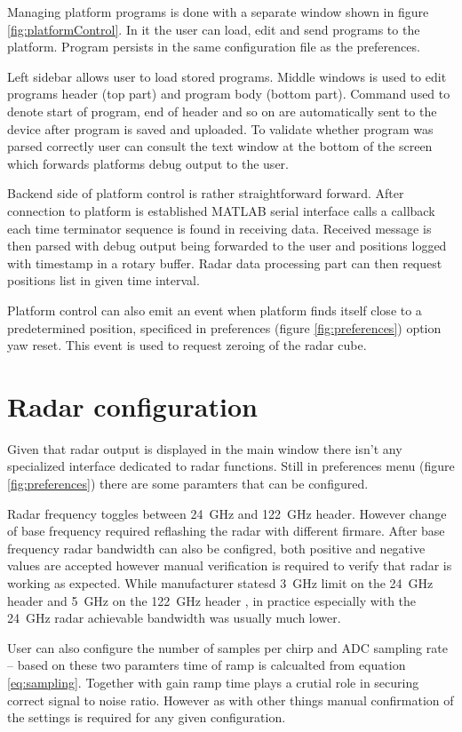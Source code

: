 Managing platform programs is done with a separate window shown in figure \ref{fig:platformControl}.
In it the user can load, edit and send programs to the platform.
Program persists in the same configuration file as the preferences.

Left sidebar allows user to load stored programs.
Middle windows is used to edit programs header (top part) and program body (bottom part).
Command used to denote start of program, end of header and so on are automatically sent to the device after program is saved and uploaded.
To validate whether program was parsed correctly user can consult the text window at the bottom of the screen which forwards platforms debug output to the user.

Backend side of platform control is rather straightforward forward.
After connection to platform is established MATLAB serial interface calls a callback each time terminator sequence is found in receiving data.
Received message is then parsed with debug output being forwarded to the user and positions logged with timestamp in a rotary buffer.
Radar data processing part can then request positions list in given time interval.

Platform control can also emit an event when platform finds itself close to a predetermined position, specificed in preferences (figure \ref{fig:preferences}) option yaw reset.
This event is used to request zeroing of the radar cube.

\section{Radar configuration}

Given that radar output is displayed in the main window there isn't any specialized interface dedicated to radar functions.
Still in preferences menu (figure \ref{fig:preferences}) there are some paramters that can be configured.

Radar frequency toggles between 24~GHz and 122~GHz header.
However change of base frequency required reflashing the radar with different firmare.
After base frequency radar bandwidth can also be configred, both positive and negative values are accepted however manual verification is required to verify that radar is working as expected.
While manufacturer statesd 3~GHz limit on the 24~GHz header and 5~GHz on the 122~GHz header \cite{sidarPRO}, in practice especially with the 24~GHz radar achievable bandwidth was usually much lower.

User can also configure the number of samples per chirp and ADC sampling rate -- based on these two paramters time of ramp is calcualted from equation \ref{eq:sampling}.
Together with gain ramp time plays a crutial role in securing correct signal to noise ratio.
However as with other things manual confirmation of the settings is required for any given configuration.

